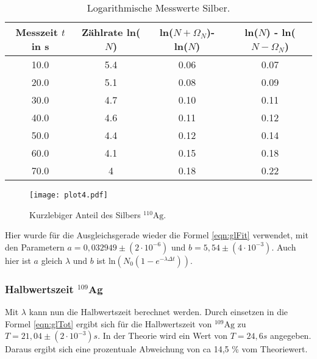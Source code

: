 \begin{table}
  \centering
  \caption{Logarithmische Messwerte Silber.}
  \label{tab:lnN2k}
\begin{tabular}{c c c c}
  \toprule
  Messzeit $t$ in s & Zählrate ln($N$) & ln($N + \Omega_N$)- ln($N$) & ln($N$) - ln($N - \Omega_N$)\\
  \midrule
  10.0 & 5.4 & 0.06 & 0.07 \\
  20.0 & 5.1 & 0.08 & 0.09 \\
  30.0 & 4.7 & 0.10 & 0.11 \\
  40.0 & 4.6 & 0.11 & 0.12 \\
  50.0 & 4.4 & 0.12 & 0.14 \\
  60.0 & 4.1 & 0.15 & 0.18 \\
  70.0 & 4 & 0.18 & 0.22 \\
  \bottomrule
\end{tabular}
\end{table}
\FloatBarrier

\begin{figure}
  \centering
  \texttt{[image: plot4.pdf]}
  \caption{Kurzlebiger Anteil des Silbers $^{110}\text{Ag}$.}
  \label{fig:plot4}
\end{figure}
\FloatBarrier

Hier wurde für die Ausgleichsgerade wieder die Formel \ref{eqn:glFit} verwendet, mit den Parametern $a = 0,032949 \pm (2 \cdot 10^{-6})$ und $b = 5,54 \pm (4 \cdot 10^{-3})$.
Auch hier ist $a$ gleich $\lambda$ und $b$ ist $\text{ln}(N_0(1-e^{-\lambda \Delta t}))$.

\subsubsection{Halbwertszeit $^{109}$Ag}

Mit $\lambda$ kann nun die Halbwertszeit berechnet werden.
Durch einsetzen in die Formel \ref{eqn:glTot} ergibt sich für die Halbwertszeit von $^{109}\text{Ag}$ zu $T = 21,04 \pm (2 \cdot 10^{-3}) s$.
In der Theorie wird ein Wert von $T = 24,6 s$ \cite{Periode} angegeben.
Daraus ergibt sich eine prozentuale Abweichung von ca 14,5 \% vom Theoriewert.